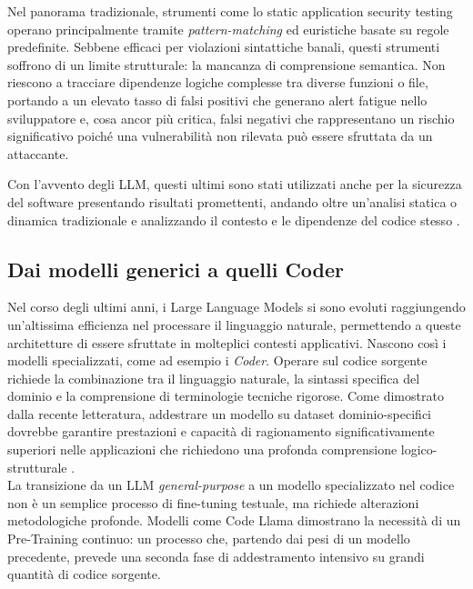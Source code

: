 Nel panorama tradizionale, strumenti come lo static application security testing operano principalmente tramite \textit{pattern-matching} ed euristiche basate su regole predefinite. Sebbene efficaci per violazioni sintattiche banali, questi strumenti soffrono di un limite strutturale: la mancanza di comprensione semantica. Non riescono a tracciare dipendenze logiche complesse tra diverse funzioni o file, portando a un elevato tasso di falsi positivi che generano alert fatigue nello sviluppatore e, cosa ancor più critica, falsi negativi che rappresentano un rischio significativo poiché una vulnerabilità non rilevata può essere sfruttata da un attaccante.

Con l'avvento degli LLM, questi ultimi sono stati utilizzati anche per la sicurezza del software presentando risultati promettenti, andando oltre un'analisi statica o dinamica tradizionale e analizzando il contesto e le dipendenze del codice stesso \cite{zhou2024comparisonstaticapplicationsecurity}.

\subsection{Dai modelli generici a quelli Coder}

Nel corso degli ultimi anni, i Large Language Models si sono evoluti raggiungendo un'altissima efficienza nel processare il linguaggio naturale, permettendo a queste architetture di essere sfruttate in molteplici contesti applicativi. Nascono così i modelli specializzati, come ad esempio i \textit{Coder}. Operare sul codice sorgente richiede la combinazione tra il linguaggio naturale, la sintassi specifica del dominio e la comprensione di terminologie tecniche rigorose. Come dimostrato dalla recente letteratura, addestrare un modello su dataset dominio-specifici dovrebbe garantire prestazioni e capacità di ragionamento significativamente superiori nelle applicazioni che richiedono una profonda comprensione logico-strutturale \cite{rozière2024codellamaopenfoundation}.\\

La transizione da un LLM \textit{general-purpose} a un modello specializzato nel codice  non è un semplice processo di fine-tuning testuale, ma richiede alterazioni metodologiche profonde. Modelli come Code Llama dimostrano la necessità di un Pre-Training continuo: un processo che, partendo dai pesi di un modello precedente, prevede una seconda fase di addestramento intensivo su grandi quantità di codice sorgente.

